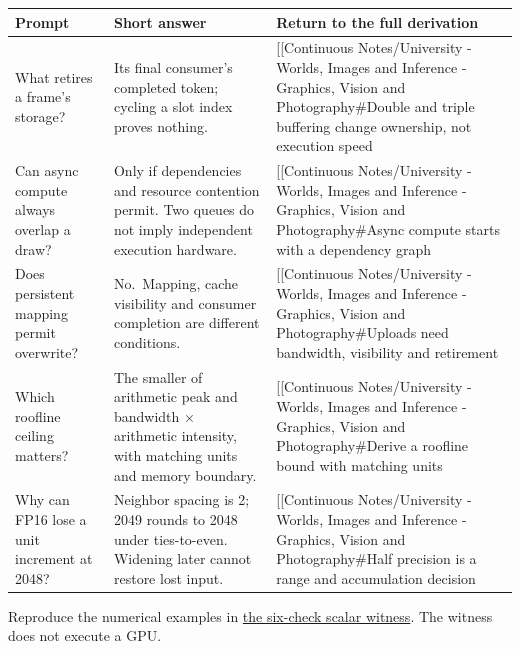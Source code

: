 {\def\LTcaptype{none} %
\begin{longtable}[]{@{}
  >{\raggedright\arraybackslash}p{}
  >{\raggedright\arraybackslash}p{}
  >{\raggedright\arraybackslash}p{}@{}}
\toprule\noalign{}
\begin{minipage}[b]{\linewidth}\raggedright
Prompt
\end{minipage} & \begin{minipage}[b]{\linewidth}\raggedright
Short answer
\end{minipage} & \begin{minipage}[b]{\linewidth}\raggedright
Return to the full derivation
\end{minipage} \\
\midrule\noalign{}
\endhead
\bottomrule\noalign{}
\endlastfoot
What retires a frame's storage? & Its final consumer's completed token; cycling a slot index proves nothing. & {[}{[}Continuous Notes/University - Worlds, Images and Inference - Graphics, Vision and Photography\#Double and triple buffering change ownership, not execution speed \\
Can async compute always overlap a draw? & Only if dependencies and resource contention permit. Two queues do not imply independent execution hardware. & {[}{[}Continuous Notes/University - Worlds, Images and Inference - Graphics, Vision and Photography\#Async compute starts with a dependency graph \\
Does persistent mapping permit overwrite? & No.~Mapping, cache visibility and consumer completion are different conditions. & {[}{[}Continuous Notes/University - Worlds, Images and Inference - Graphics, Vision and Photography\#Uploads need bandwidth, visibility and retirement \\
Which roofline ceiling matters? & The smaller of arithmetic peak and bandwidth × arithmetic intensity, with matching units and memory boundary. & {[}{[}Continuous Notes/University - Worlds, Images and Inference - Graphics, Vision and Photography\#Derive a roofline bound with matching units \\
Why can FP16 lose a unit increment at 2048? & Neighbor spacing is 2; 2049 rounds to 2048 under ties-to-even. Widening later cannot restore lost input. & {[}{[}Continuous Notes/University - Worlds, Images and Inference - Graphics, Vision and Photography\#Half precision is a range and accumulation decision \\
\end{longtable}
}

Reproduce the numerical examples in \href{Continuous\%20Notes/University\%20-\%20Worlds,\%20Images\%20and\%20Inference\%20-\%20Graphics,\%20Vision\%20and\%20Photography\#Check\%20the\%20scheduling\%20and\%20precision\%20examples\%20with\%20a\%20scalar\%20witness}{the six-check scalar witness}. The witness does not execute a GPU.
